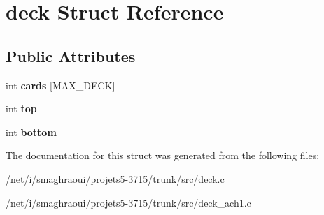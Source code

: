\hypertarget{structdeck}{\section{deck Struct Reference}
\label{structdeck}
}
\subsection*{Public Attributes}
\begin{DoxyCompactItemize}
\item 
\hypertarget{structdeck_ac71757dac9a2b2aef9c3703a872dc421}{int {\bfseries cards} \mbox{[}M\-A\-X\-\_\-\-D\-E\-C\-K\mbox{]}}\label{structdeck_ac71757dac9a2b2aef9c3703a872dc421}

\item 
\hypertarget{structdeck_afd604e2f1bdd663470c602eed6a141b2}{int {\bfseries top}}\label{structdeck_afd604e2f1bdd663470c602eed6a141b2}

\item 
\hypertarget{structdeck_a6580f5d075872bd2690c81e93a92b643}{int {\bfseries bottom}}\label{structdeck_a6580f5d075872bd2690c81e93a92b643}

\end{DoxyCompactItemize}


The documentation for this struct was generated from the following files\-:\begin{DoxyCompactItemize}
\item 
/net/i/smaghraoui/projets5-\/3715/trunk/src/deck.\-c\item 
/net/i/smaghraoui/projets5-\/3715/trunk/src/deck\-\_\-ach1.\-c\end{DoxyCompactItemize}
